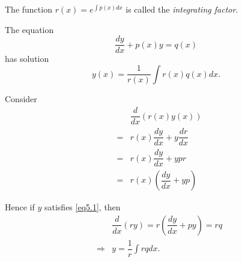 The function $r(x) =  e^{\int p(x)dx}$ is called the \emph{integrating factor}.

\begin{proposition}
The equation
\begin{equation}
 \dfrac{dy}{dx} + p(x)y = q(x)
 \label{eq5.1}
\end{equation}
has solution
\[
 y(x) = \dfrac{1}{r(x)} \int r(x)q(x)dx.
\]
\end{proposition}

\begin{Proof}
Consider
\begin{eqnarray*}
 && \dfrac{d}{dx} (r(x)y(x)) \\
 &=& r(x) \dfrac{dy}{dx} + y \dfrac{dr}{dx}\\
 &=& r(x) \dfrac{dy}{dx} + y pr\\
 &=& r(x) \left(\dfrac{dy}{dx} + y p\right)
\end{eqnarray*}

Hence if $y$ satisfies \eqref{eq5.1}, then
\begin{eqnarray*}
 && \dfrac{d}{dx}(ry) = r \left(\dfrac{dy}{dx}+py\right) = rq\\
 &\Rightarrow& y = \dfrac{1}{r} \int rq dx.
\end{eqnarray*}
\end{Proof}


